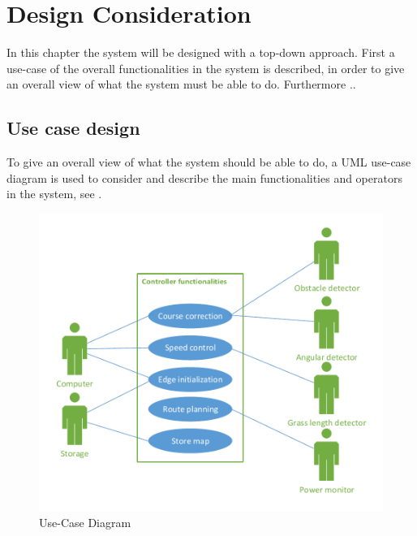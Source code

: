 \chapter{Design Consideration}
In this chapter the system will be designed with a top-down approach. First a use-case of the overall functionalities in the system is described, in order to give an overall view of what the system must be able to do. Furthermore ..  

\section{Use case design}
To give an overall view of what the system should be able to do, a UML use-case diagram is used to consider and describe the main functionalities and operators in the system, see .

 \begin{figure}[H]
	\centering
	\includegraphics[scale=0.9]{figures/P5UseCase.pdf}
	\caption{Use-Case Diagram}
	\label{fig:usecase}
	\flushleft
\end{figure}


